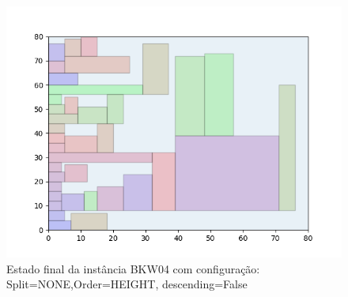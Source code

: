 \begin{figure}[H]
    \centering
    \caption[]{Estado final da instância BKW04 com configuração: Split=NONE,Order=HEIGHT, descending=False}
    \label{fig:bkw04-none-height-false}
    \includegraphics[scale=0.5]{output/figures/bkw/bkw04/none/height/false/00}
\end{figure}
